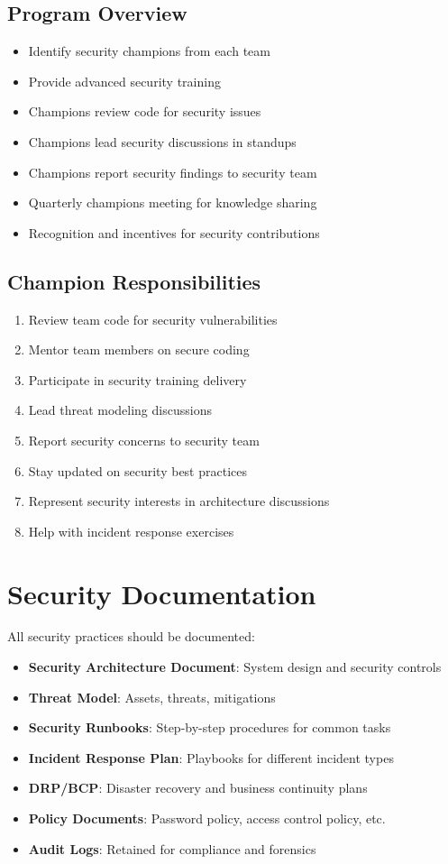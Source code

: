 \documentclass{report}
\begin{document}
\subsection{Program Overview}
\begin{itemize}
\item Identify security champions from each team
\item Provide advanced security training
\item Champions review code for security issues
\item Champions lead security discussions in standups
\item Champions report security findings to security team
\item Quarterly champions meeting for knowledge sharing
\item Recognition and incentives for security contributions
\end{itemize}

\subsection{Champion Responsibilities}
\begin{enumerate}
\item Review team code for security vulnerabilities
\item Mentor team members on secure coding
\item Participate in security training delivery
\item Lead threat modeling discussions
\item Report security concerns to security team
\item Stay updated on security best practices
\item Represent security interests in architecture discussions
\item Help with incident response exercises
\end{enumerate}

\section{Security Documentation}

All security practices should be documented:
\begin{itemize}
\item \textbf{Security Architecture Document}: System design and security controls
\item \textbf{Threat Model}: Assets, threats, mitigations
\item \textbf{Security Runbooks}: Step-by-step procedures for common tasks
\item \textbf{Incident Response Plan}: Playbooks for different incident types
\item \textbf{DRP/BCP}: Disaster recovery and business continuity plans
\item \textbf{Policy Documents}: Password policy, access control policy, etc.
\item \textbf{Audit Logs}: Retained for compliance and forensics
\end{itemize}
\end{document}
